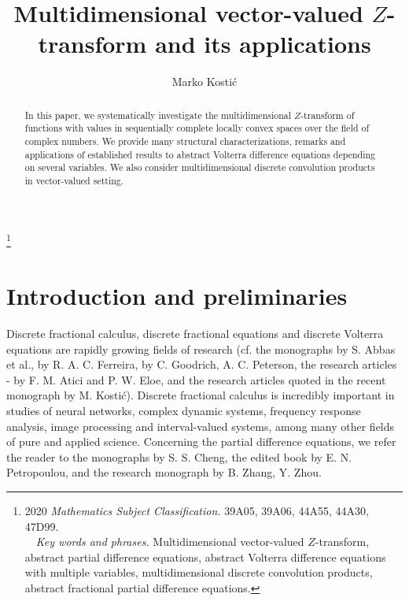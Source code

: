\documentclass{amsart}
\theoremstyle{definition}
\theoremstyle{remark}
\numberwithin{equation}{section}
\begin{document}
\title[Multidimensional vector-valued $Z$-transform...]{Multidimensional vector-valued $Z$-transform and its applications}

\author{Marko Kosti\' c}
\address{Faculty of Technical Sciences,
University of Novi Sad,
Trg D. Obradovi\' ca 6, 21125 Novi Sad, Serbia}

{\renewcommand{\thefootnote}{} \footnote{2020 {\it Mathematics
Subject Classification.} 39A05, 39A06, 44A55, 44A30, 47D99.
\\ \text{  }  \ \    {\it Key words and phrases.} Multidimensional vector-valued $Z$-transform, abstract partial difference equations, abstract Volterra difference equations with multiple variables, multidimensional discrete convolution products, abstract fractional partial difference equations.}}

\begin{abstract}
In this paper, we systematically
investigate the multidimensional $Z$-transform of functions with values in sequentially complete locally convex spaces over the field of complex numbers. We provide many structural characterizations, remarks and applications of established results to abstract Volterra difference equations depending on several variables. We also consider multidimensional discrete convolution products in vector-valued setting.
\end{abstract}
\maketitle

\section{Introduction and preliminaries}

Discrete fractional calculus, discrete fractional equations and discrete Volterra equations are rapidly growing fields of research (cf. the  monographs \cite{abbasi} by S. Abbas et al., \cite{fere} by R. A. C. Ferreira, \cite{dfc} by
C. Goodrich, A. C. Peterson, the research articles \cite{atici1}-\cite{atici3} by F. M. Atici and P. W. Eloe, and the research articles quoted in the recent monograph \cite{funkcionalne} by M. Kosti\' c). Discrete fractional calculus is incredibly important in studies of neural networks, complex dynamic systems, frequency response analysis, image processing and interval-valued systems, among many other fields of pure and applied science. Concerning the partial difference equations, we refer the reader to the monographs \cite{sscheng} by S. S. Cheng, the edited book \cite{petro} by E. N. Petropoulou, and the research monograph \cite{delaydiff} by B. Zhang, Y. Zhou.  
\end{document}
